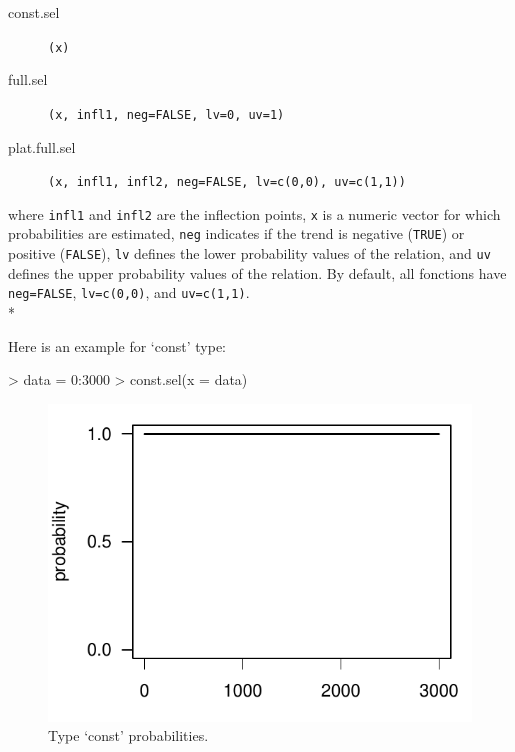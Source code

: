 \documentclass[letterpaper, 12pt]{article}
\begin{document}
\begin{description}
\item[const.sel]\verb#(x)#
\item[full.sel]\verb#(x, infl1, neg=FALSE, lv=0, uv=1)#
\item[plat.full.sel]\verb#(x, infl1, infl2, neg=FALSE, lv=c(0,0), uv=c(1,1))#
\end{description}
where \verb#infl1# and \verb#infl2# are the inflection points, \verb#x# is a numeric vector for which probabilities are 
estimated, \verb#neg# indicates if the trend is negative  (\verb#TRUE#) or positive (\verb#FALSE#), \verb#lv# defines the 
lower probability values of the relation, and \verb#uv# defines the upper probability values of the relation. By default, 
all fonctions have \verb#neg=FALSE#, \verb#lv=c(0,0)#, and \verb#uv=c(1,1)#.\\*

Here is an example for `const' type:


\begin{Schunk}
\begin{Sinput}
> data = 0:3000
> const.sel(x = data)
\end{Sinput}
\end{Schunk}

\begin{figure}[h]
\vspace{-20pt}
\begin{center}
\includegraphics{relation_sel-003}
\end{center}
  \vspace{-30pt}
  \caption{Type `const' probabilities.}
  \vspace{-10pt}
\label{fig1}
\end{figure}
\vspace*{\fill;}
\end{document}
